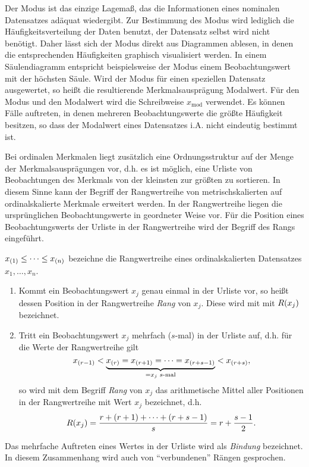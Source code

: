 \documentclass{lecture}
\begin{document}
    Der Modus ist das einzige Lagemaß, das die Informationen eines nominalen Datensatzes adäquat wiedergibt.
    Zur Bestimmung des Modus wird lediglich die Häufigkeitsverteilung der Daten benutzt, der Datensatz selbst wird nicht benötigt.
    Daher lässt sich der Modus direkt aus Diagrammen ablesen, in denen die entsprechenden Häufigkeiten graphisch visualisiert werden.
    In einem Säulendiagramm entspricht beispielsweise der Modus einem Beobachtungswert mit der höchsten Säule.
    Wird der Modus für einen speziellen Datensatz ausgewertet, so heißt die resultierende Merkmalsausprägung Modalwert.
    Für den Modus und den Modalwert wird die Schreibweise \(x_{\text{mod}}\) verwendet.
    Es können Fälle auftreten, in denen mehreren Beobachtungswerte die größte Häufigkeit besitzen, so dass der Modalwert eines Datensatzes i.A. nicht eindeutig bestimmt ist.

    Bei ordinalen Merkmalen liegt zusätzlich eine Ordnungsstruktur auf der Menge der Merkmalsausprägungen vor, d.h. es ist möglich, eine Urliste von Beobachtungen des Merkmals von der kleinsten zur größten zu sortieren.
    In diesem Sinne kann der Begriff der Rangwertreihe von metrischskalierten auf ordinalskalierte Merkmale erweitert werden.
    In der Rangwertreihe liegen die ursprünglichen Beobachtungswerte in geordneter Weise vor.
    Für die Position eines Beobachtungswerts der Urliste in der Rangwertreihe wird der Begriff des Rangs eingeführt.

    \begin{definition}
        \(x_{\parentheses*{1}} \le \cdots \le x_{\parentheses*{n}}\) bezeichne die Rangwertreihe eines ordinalskalierten Datensatzes \(x_1, \ldots, x_n\).
        \begin{enumerate}
            \item Kommt ein Beobachtungswert \(x_j\) genau einmal in der Urliste vor, so heißt dessen Position in der Rangwertreihe \emph{Rang} von \(x_j\).
            Diese wird mit mit \(R\parentheses*{x_j}\) bezeichnet.
            \item Tritt ein Beobachtungswert \(x_j\) mehrfach (\(s\)-mal) in der Urliste auf, d.h. für die Werte der Rangwertreihe gilt
            \[
                x_{\parentheses*{r - 1}} < \underbrace{x_{\parentheses*{r}} = x_{\parentheses*{r + 1}} = \cdots = x_{\parentheses*{r + s - 1}}}_{= x_j\text{ \(s\)-mal}} < x_{\parentheses*{r + s}},
            \]
            so wird mit dem Begriff \emph{Rang} von \(x_j\) das arithmetische Mittel aller Positionen in der Rangwertreihe mit Wert \(x_j\) bezeichnet, d.h.
            \[
                R\parentheses*{x_j} = \frac{r + \parentheses*{r + 1} + \cdots + \parentheses*{r + s - 1}}{s} = r + \frac{s - 1}{2}.
            \]
        \end{enumerate}
        Das mehrfache Auftreten eines Wertes in der Urliste wird als \emph{Bindung} bezeichnet.
        In diesem Zusammenhang wird auch von ``verbundenen'' Rängen gesprochen.
    \end{definition}
\end{document}
